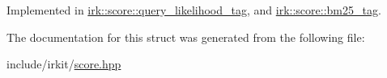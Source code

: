 Implemented in \mbox{\hyperlink{structirk_1_1score_1_1query__likelihood__tag_af0559f12be12863cf0fe6a6df56829f8}{irk\+::score\+::query\+\_\+likelihood\+\_\+tag}}, and \mbox{\hyperlink{structirk_1_1score_1_1bm25__tag_a3575a5c838ad5a235198d525e665e0f1}{irk\+::score\+::bm25\+\_\+tag}}.



The documentation for this struct was generated from the following file\+:\begin{DoxyCompactItemize}
\item 
include/irkit/\mbox{\hyperlink{score_8hpp}{score.\+hpp}}\end{DoxyCompactItemize}
